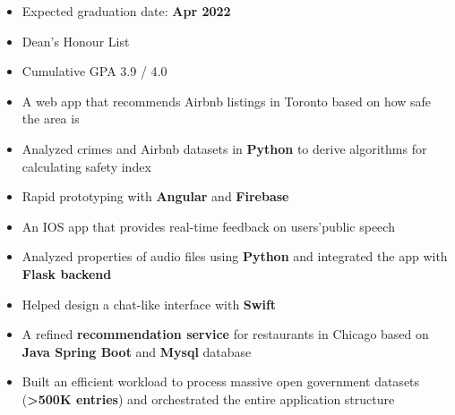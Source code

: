 
\begin{itemize}
\item Expected graduation date: \textbf{Apr 2022}
\item Dean's Honour List
\item Cumulative GPA 3.9 \// 4.0 
\end{itemize}


\vspace{-2mm}
\begin{itemize}
\item A web app that recommends
Airbnb listings in Toronto based on how
safe the area is
\item  Analyzed crimes and Airbnb
datasets in \textbf{Python} to derive algorithms for
calculating safety index
\item Rapid prototyping with \textbf{Angular} and \textbf{Firebase}
\end{itemize}
\vspace{-3mm}

\divider

\vspace{-1mm}
\begin{itemize}
\item An IOS app that provides real-time feedback on users\rq  \space public speech
\item Analyzed properties of audio files using \textbf{Python} and integrated the app with \textbf{Flask backend}
\item Helped design a chat-like interface with \textbf{Swift}
\end{itemize}
\vspace{-2mm}
\divider

\vspace{-2mm}
\begin{itemize}
 \item A refined \textbf{recommendation service} for restaurants in Chicago based on \textbf{Java Spring Boot} and \textbf{Mysql} database
 
 \item Built an efficient workload to process massive open government datasets (\textbf{>500K entries}) and orchestrated the entire application structure
 

\end{itemize}


